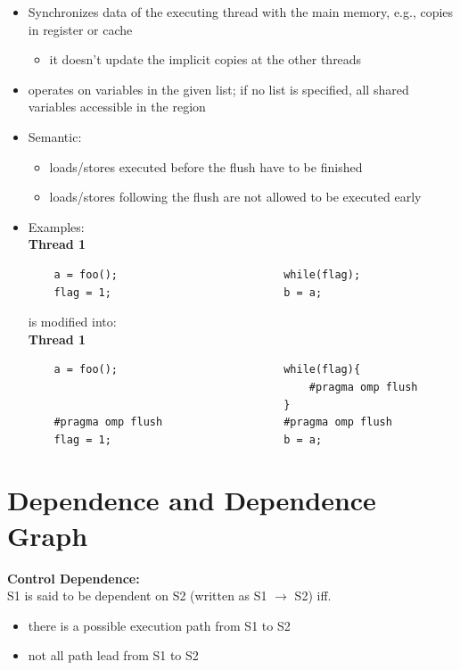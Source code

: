\documentclass[12pt, a4paper]{report}
\begin{document}
\begin{itemize}
    \item Synchronizes data of the executing thread with the main memory, e.g., copies in register or cache
    \begin{itemize}
        \item it doesn't update the implicit copies at the other threads
    \end{itemize}
    \item operates on variables in the given list; if no list is specified, all shared variables accessible in the region
    \item Semantic:
    \begin{itemize}
        \item loads/stores executed before the flush have to be finished
        \item loads/stores following the flush are not allowed to be executed early
    \end{itemize}
    \item Examples:\\[1em]
    {\bfseries{Thread 1}}\qquad\qquad\qquad\qquad\qquad\qquad{}
    \begin{verbatim}
    a = foo();                          while(flag);
    flag = 1;                           b = a;
    \end{verbatim}
    is modified into:\\[1em]
    {\bfseries{Thread 1}}\qquad\qquad\qquad\qquad\qquad\qquad{}
    \begin{verbatim}
    a = foo();                          while(flag){
                                            #pragma omp flush
                                        }
    #pragma omp flush                   #pragma omp flush
    flag = 1;                           b = a;
    \end{verbatim}

\end{itemize}

\section{Dependence and Dependence Graph}
{\bfseries{Control Dependence:}}\\
S1 is said to be dependent on S2 (written as S1 $\rightarrow$ S2) iff. 
\begin{itemize}
    \item there is a possible execution path from S1 to S2
    \item not all path lead from S1 to S2
\end{itemize}
\end{document}
